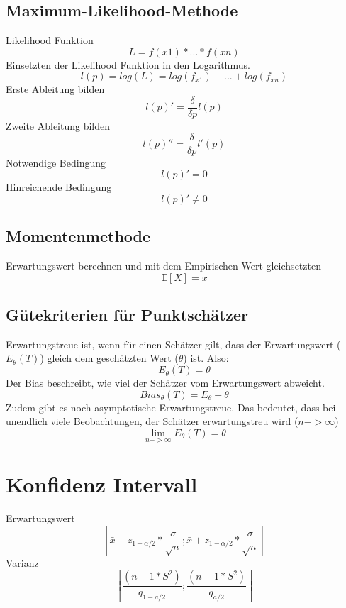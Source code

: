 \documentclass{article}
\begin{document}
	\subsection{Maximum-Likelihood-Methode}
	Likelihood Funktion
	\[L = f(x1) * ... * f(xn)\]
	Einsetzten der Likelihood Funktion in den Logarithmus.
	\[l(p) = log(L) = log(f_{x1})+...+log(f_{xn}) \]
	Erste Ableitung bilden
	\[l(p)' = \frac{\delta}{\delta p} l(p)\]
	Zweite Ableitung bilden
	\[l(p)'' = \frac{\delta}{\delta p} l'(p)\]
	Notwendige Bedingung
	\[l(p)' = 0\]
	Hinreichende Bedingung
	\[l(p)' \ne 0 \]
	\subsection{Momentenmethode}
	Erwartungswert berechnen und mit dem Empirischen Wert gleichsetzten
	\[\mathbb{E}[X]=\bar{x}\]
	\subsection{Gütekriterien für Punktschätzer}
	Erwartungstreue ist, wenn für einen Schätzer gilt, dass der Erwartungswert ($E_\theta(T)$) gleich dem geschätzten Wert ($\theta$) ist. Also:
	\[E_\theta(T)=\theta\] 
	Der Bias beschreibt, wie viel der Schätzer vom Erwartungswert abweicht.
	\[Bias_\theta(T)=E_\theta-\theta\]
	Zudem gibt es noch asymptotische Erwartungstreue. Das bedeutet, dass bei unendlich viele Beobachtungen, der Schätzer erwartungstreu wird ($n -> \infty$)
	\[\lim\limits_{n -> \infty} E_\theta(T) = \theta\]
	\section{Konfidenz Intervall}
	Erwartungswert
	\[[\bar{x}-z_{1-\alpha/2}*\frac{\sigma}{\sqrt{n}};\bar{x}+z_{1-\alpha/2}*\frac{\sigma}{\sqrt{n}}]\]
	Varianz
	\[[\frac{(n-1*S^2)}{q_{1-a/2}};\frac{(n-1*S^2)}{q_{a/2}}]\]
\end{document}
